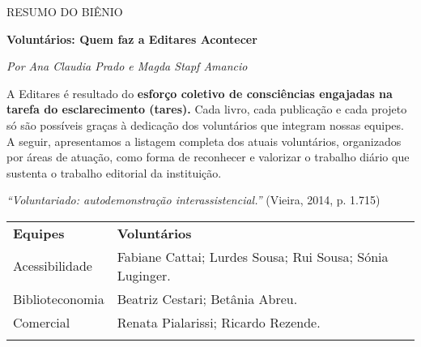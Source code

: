 RESUMO DO BIÊNIO

\textbf{Voluntários: Quem faz a Editares Acontecer}

\emph{Por Ana Claudia Prado e Magda Stapf Amancio}

A Editares é resultado do \textbf{esforço coletivo de consciências engajadas na tarefa do esclarecimento (tares).} Cada livro, cada publicação e cada projeto só são possíveis graças à dedicação dos voluntários que integram nossas equipes. A seguir, apresentamos a listagem completa dos atuais voluntários, organizados por áreas de atuação, como forma de reconhecer e valorizar o trabalho diário que sustenta o trabalho editorial da instituição.

\emph{``Voluntariado: autodemonstração interassistencial.''} (Vieira, 2014, p. 1.715)

\begin{longtable}[]{@{}
  >{\raggedright\arraybackslash}p{}
  >{\raggedright\arraybackslash}p{}@{}}
\toprule\noalign{}
\begin{minipage}[b]{\linewidth}\centering
\textbf{Equipes}
\end{minipage} & \begin{minipage}[b]{\linewidth}\centering
\textbf{Voluntários}
\end{minipage} \\
\begin{minipage}[b]{\linewidth}\raggedright
Acessibilidade
\end{minipage} & \begin{minipage}[b]{\linewidth}\raggedright
Fabiane Cattai; Lurdes Sousa; Rui Sousa; Sónia Luginger.
\end{minipage} \\
\begin{minipage}[b]{\linewidth}\raggedright
Biblioteconomia
\end{minipage} & \begin{minipage}[b]{\linewidth}\raggedright
Beatriz Cestari; Betânia Abreu.
\end{minipage} \\
\begin{minipage}[b]{\linewidth}\raggedright
Comercial
\end{minipage} & \begin{minipage}[b]{\linewidth}\raggedright
Renata Pialarissi; Ricardo Rezende.
\end{minipage} \\
\begin{minipage}[b]{\linewidth}\raggedright

\end{minipage}
\end{longtable}
